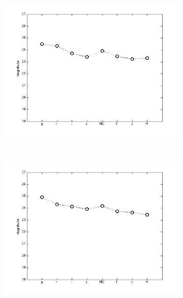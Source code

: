 \documentclass[useAMS,usenatbib,fleqn]{mn2e}
\begin{document}
\begin{figure}
        \centering
        
        \begin{subfigure}[b]{0.075\textwidth}
                \includegraphics[trim = 35px 15px 50px 25px, clip=true,width=\textwidth]{figures/basis_01.jpg}
        \end{subfigure}
	~
        \begin{subfigure}[b]{0.075\textwidth}
                \includegraphics[trim = 35px 15px 50px 25px, clip=true,width=\textwidth]{figures/basis_02.jpg}
        \end{subfigure}
        ~
        \begin{subfigure}[b]{0.075\textwidth}

\end{subfigure}
\end{figure}
\end{document}
